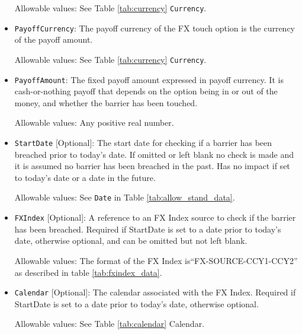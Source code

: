 \begin{itemize}
Allowable values:  See Table \ref{tab:currency} \lstinline!Currency!.

\item \lstinline!PayoffCurrency!: The payoff currency of the FX touch option is the currency of the payoff amount. 

Allowable values:  See Table \ref{tab:currency} \lstinline!Currency!.

\item \lstinline!PayoffAmount!: The fixed payoff amount expressed in payoff currency. It is cash-or-nothing payoff that depends on the option being in or out of the money, and whether the barrier has been touched.

Allowable values:  Any positive real number.

\item \lstinline!StartDate! [Optional]: The start date for checking if a barrier has been breached prior to today's date.  If omitted or left blank no check is made and it is assumed no barrier has been breached in the past. Has no impact if set to today's date or a date in the future.

Allowable values:  See \lstinline!Date! in Table \ref{tab:allow_stand_data}.

\item \lstinline!FXIndex! [Optional]: A reference to an FX Index source to check if the barrier has been breached. Required if StartDate is set to a date prior to today's date, otherwise optional, and can be omitted but not left blank.

Allowable values:  The format of the FX Index is``FX-SOURCE-CCY1-CCY2'' as described in table \ref{tab:fxindex_data}. 

\item \lstinline!Calendar! [Optional]: The calendar associated with the FX Index. Required if StartDate is set to a date prior to today's date, otherwise optional.

Allowable values: See Table \ref{tab:calendar} Calendar.
\end{itemize}

